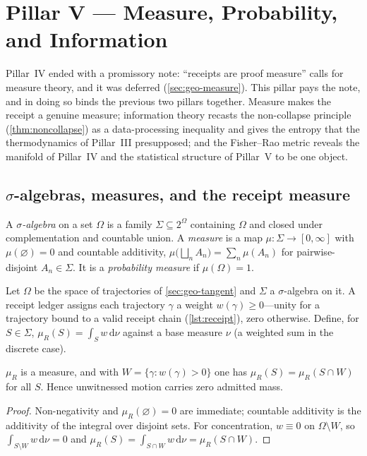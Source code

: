 \section{Pillar V --- Measure, Probability, and Information}
\label{sec:measure}

Pillar~IV ended with a promissory note: ``receipts are proof measure'' calls for
measure theory, and it was deferred (\cref{sec:geo-measure}). This pillar pays the
note, and in doing so binds the previous two pillars together. Measure makes the
receipt a genuine measure; information theory recasts the non-collapse principle
(\cref{thm:noncollapse}) as a data-processing inequality and gives the entropy that
the thermodynamics of Pillar~III presupposed; and the Fisher--Rao metric reveals
the manifold of Pillar~IV and the statistical structure of Pillar~V to be one
object.

\subsection{$\sigma$-algebras, measures, and the receipt measure}
\label{sec:meas-sigma}

\begin{definition}
A \emph{$\sigma$-algebra} on a set $\Omega$ is a family $\Sigma\subseteq 2^{\Omega}$
containing $\Omega$ and closed under complementation and countable union. A
\emph{measure} is a map $\mu\colon\Sigma\to[0,\infty]$ with $\mu(\varnothing)=0$ and
countable additivity, $\mu\bigl(\bigsqcup_{n}A_{n}\bigr)=\sum_{n}\mu(A_{n})$ for
pairwise-disjoint $A_n\in\Sigma$. It is a \emph{probability measure} if
$\mu(\Omega)=1$.
\end{definition}

\begin{construction}
\label{con:receipt-measure}
Let $\Omega$ be the space of trajectories of \cref{sec:geo-tangent} and $\Sigma$ a
$\sigma$-algebra on it. A receipt ledger assigns each trajectory $\gamma$ a weight
$w(\gamma)\ge 0$---unity for a trajectory bound to a valid receipt chain
(\cref{lst:receipt}), zero otherwise. Define, for $S\in\Sigma$,
$\mu_R(S)=\int_S w\,\mathrm d\nu$ against a base measure $\nu$ (a weighted sum in the
discrete case).
\end{construction}

\begin{proposition}
\label{prop:receipt-measure}
$\mu_R$ is a measure, and with $W=\{\gamma:w(\gamma)>0\}$ one has
$\mu_R(S)=\mu_R(S\cap W)$ for all $S$. Hence unwitnessed motion carries zero admitted
mass.
\end{proposition}
\begin{proof}
Non-negativity and $\mu_R(\varnothing)=0$ are immediate; countable additivity is the
additivity of the integral over disjoint sets. For concentration,
$w\equiv 0$ on $\Omega\setminus W$, so $\int_{S\setminus W}w\,\mathrm d\nu=0$ and
$\mu_R(S)=\int_{S\cap W}w\,\mathrm d\nu=\mu_R(S\cap W)$.
\end{proof}

